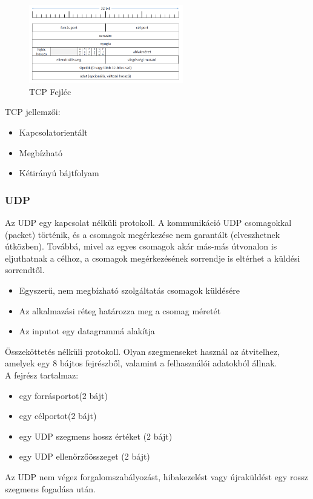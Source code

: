 \documentclass[12pt]{article}
\begin{document}
    \begin{figure}[H]
        \centering
        \includegraphics[width=0.6\textwidth]{img/tcp_fejlec.png}
        \caption{TCP Fejléc}
    \end{figure}
    \noindent TCP jellemzői:
    \begin{itemize}
        \item Kapcsolatorientált
        \item Megbízható
        \item Kétirányú bájtfolyam
    \end{itemize}

	\subsubsection*{UDP}

    Az UDP egy kapcsolat nélküli protokoll. A kommunikáció UDP csomagokkal (packet) történik, és a csomagok megérkezése nem garantált (elveszhetnek útközben). Továbbá, mivel az egyes csomagok akár más-más útvonalon is eljuthatnak a célhoz, a csomagok megérkezésének sorrendje is eltérhet a küldési sorrendtől.

    \begin{itemize}
        \item Egyszerű, nem megbízható szolgáltatás csomagok küldésére
        \item Az alkalmazási réteg határozza meg a csomag méretét
        \item Az inputot egy datagrammá alakítja	
    \end{itemize}
    Összeköttetés nélküli protokoll. Olyan szegmenseket használ az átvitelhez, amelyek egy 8 bájtos fejrészből, valamint a felhasználói adatokból állnak.\\

    \noindent A fejrész tartalmaz:
    \begin{itemize}
        \item egy forrásportot(2 bájt)
        \item egy célportot(2 bájt)
        \item egy UDP szegmens hossz értéket (2 bájt)
        \item egy UDP ellenőrzőösszeget (2 bájt)		
    \end{itemize}
    Az UDP nem végez forgalomszabályozást, hibakezelést vagy újraküldést egy rossz szegmens fogadása után. \\
\end{document}
